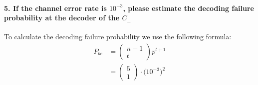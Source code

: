 \documentclass[Main]{subfiles}
\begin{document}
\paragraph{5. If the channel error rate is $10^{-3}$, please estimate the decoding failure probability at the decoder of the $C_\perp$}
To calculate the decoding failure probability we use the following formula:
\begin{align*}
P_{be} &= \left(\begin{matrix}
n-1\\
t
\end{matrix}\right) p^{t+1} \\
	&= \left(\begin{matrix}
	5\\
	1
	\end{matrix}\right)\cdot \big(10^{-3}\big)^2
\end{align*}
\end{document}
